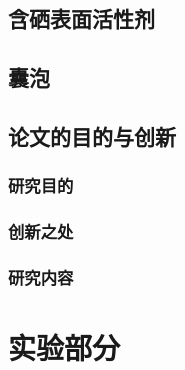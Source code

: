 \documentclass[bachelor,fandolfonts,replaceperiod]{jnuthesis} %
\begin{document}
    
    \section{含硒表面活性剂}
    \zhlipsum[1]
    
    \section{囊泡}
    \zhlipsum[1]
    
    \section{论文的目的与创新}
    \subsection{研究目的}
    \zhlipsum[1]
    \subsection{创新之处}
    \zhlipsum[1]
    \subsection{研究内容}
    \zhlipsum[1]
    
    \chapter{实验部分}\label{chapter:experiment}
\end{document}
